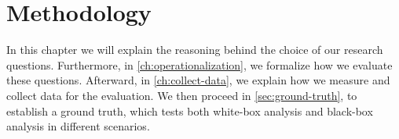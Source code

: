 \chapter{Methodology}\label{ch:methodology}

In this chapter we will explain the reasoning behind the choice of our research questions. 
Furthermore, in \autoref{ch:operationalization}, we formalize how we evaluate these questions. Afterward,
in \autoref{ch:collect-data}, we explain how we measure and collect data for the evaluation.
We then proceed in \autoref{sec:ground-truth}, to establish a ground truth, which tests both white-box analysis and black-box analysis in 
different scenarios.


